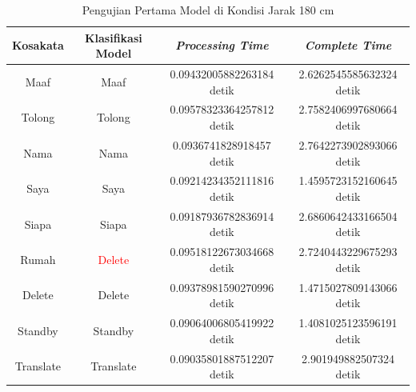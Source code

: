 \begin{longtable}{|c|c|c|c|}
  \caption{Pengujian Pertama Model di Kondisi Jarak 180 cm}
  \label{tb:prediksipendek1}                                   \\
  \hline
  \rowcolor[HTML]{C0C0C0}
  \textbf{Kosakata} & \textbf{Klasifikasi Model} & \textbf{\emph{Processing Time}} & \textbf{\emph{Complete Time}}\\
  \hline
  Maaf              & Maaf                          & 0.09432005882263184 detik                          & 2.6262545585632324 detik                                 \\
  Tolong            & Tolong                        & 0.09578323364257812 detik                          & 2.7582406997680664 detik                                 \\
  Nama              & Nama                          & 0.0936741828918457 detik                           & 2.7642273902893066 detik                                 \\
  Saya              & Saya                          & 0.09214234352111816 detik                          & 1.4595723152160645 detik                                 \\
  Siapa              & Siapa                        & 0.09187936782836914 detik                          & 2.6860642433166504 detik                                 \\
  Rumah             & \textcolor{red}{Delete}       & 0.09518122673034668 detik                          & 2.7240443229675293 detik                                 \\
  Delete            & Delete                        & 0.09378981590270996 detik                          & 1.4715027809143066 detik                                 \\
  Standby           & Standby                       & 0.09064006805419922 detik                          & 1.4081025123596191 detik                                 \\
  Translate         & Translate                     & 0.09035801887512207 detik                          & 2.901949882507324 detik                                \\
  \hline
\end{longtable}

